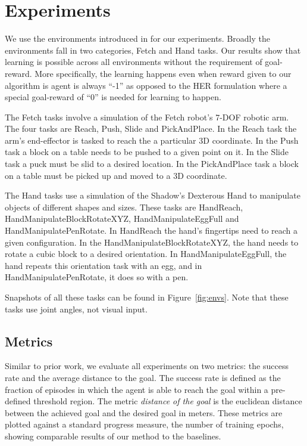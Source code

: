 \section{Experiments}
\label{sec:experiments}
We use the environments introduced in \citet{plappert2018multi} for our experiments.
Broadly the environments fall in two categories, Fetch and Hand tasks.
Our results show that learning is possible across all environments
without the requirement of goal-reward. More specifically, the learning happens
even when reward given to our algorithm is agent is always ``-1'' as opposed to
the HER formulation where a special goal-reward of ``0'' is needed for learning
to happen.

The Fetch tasks involve a simulation of the Fetch robot's 7-DOF robotic arm. The four tasks are Reach, Push,
Slide and PickAndPlace.
In the Reach task the arm's end-effector is tasked to reach the a particular 3D coordinate. 
In the Push task a block on a table needs to be pushed to a given point on it.
In the Slide task a puck must be slid to a desired location.
In the PickAndPlace task a block on a table must be picked up and moved to a
3D coordinate.

The Hand tasks use a simulation of the Shadow's Dexterous Hand to manipulate objects of
different shapes and sizes. These tasks are HandReach,
HandManipulateBlockRotateXYZ, HandManipulateEggFull and HandManipulatePenRotate.
In HandReach the hand's fingertips need to reach a given configuration.
In the HandManipulateBlockRotateXYZ, the hand needs to rotate a cubic
block to a desired orientation.
In HandManipulateEggFull, the hand repeats this orientation task with an egg, and in
HandManipulatePenRotate, it does so with a pen.

Snapshots of all these tasks can be found in Figure~\ref{fig:envs}. Note that
these tasks use joint angles, not visual input.


\subsection{Metrics}
Similar to prior work, we evaluate all experiments on two metrics: the success
rate and the average distance to the goal. The success rate is defined as the
fraction of episodes in which the agent is able to reach the goal within a
pre-defined threshold region.
The metric \emph{distance of the goal} is the euclidean distance between
the achieved goal and the desired goal in meters.
These metrics are plotted against a standard progress measure, the
number of training epochs, showing
comparable results of our method to the baselines.


